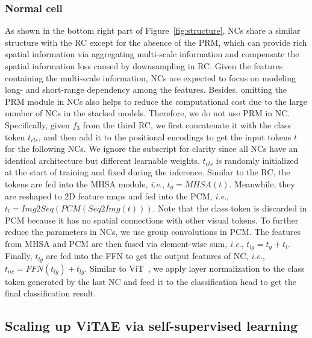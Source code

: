 \documentclass[twocolumn]{svjour3}          \smartqed  \usepackage{natbib}
\newcommand{\ie}{i.e}
\def\onedot{.\xspace}
\def\ie{\emph{i.e}\onedot}
\begin{document}
\subsubsection{Normal cell}
As shown in the bottom right part of Figure~\ref{fig:structure}, NCs share a similar structure with the RC except for the absence of the PRM, which can provide rich spatial information via aggregating multi-scale information and compensate the spatial information loss caused by downsampling in RC. Given the features containing the multi-scale information, NCs are expected to focus on modeling long- and short-range dependency among the features. Besides, omitting the PRM module in NCs also helps to reduce the computational cost due to the large number of NCs in the stacked models. Therefore, we do not use PRM in NC. Specifically, given $f_{3}$ from the third RC, we first concatenate it with the class token $t_{cls}$, and then add it to the positional encodings to get the input tokens $t$ for the following NCs. We ignore the subscript for clarity since all NCs have an identical architecture but different learnable weights. $t_{cls}$ is randomly initialized at the start of training and fixed during the inference. Similar to the RC, the tokens are fed into the MHSA module, \ie, $t_g = MHSA(t)$. Meanwhile, they are reshaped to 2D feature maps and fed into the PCM, \ie, $t_l = Img2Seq(PCM(Seq2Img(t)))$. Note that the class token is discarded in PCM because it has no spatial connections with other visual tokens.
To further reduce the parameters in NCs, we use group convolutions in PCM. The features from MHSA and PCM are then fused via element-wise sum, \ie, $t_{lg} = t_g + t_l$. 
Finally, $t_{lg}$ are fed into the FFN to get the output features of NC, \ie, $t_{nc} = FFN(t_{lg}) + t_{lg}$.
Similar to ViT~\citep{dosovitskiy2020image}, we apply layer normalization to the class token generated by the last NC and feed it to the classification head to get the final classification result. 

\subsection{Scaling up ViTAE via self-supervised learning}
\end{document}
